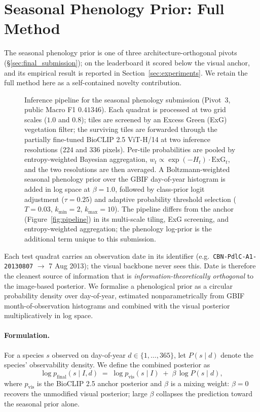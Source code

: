\section{Seasonal Phenology Prior: Full Method}
\label{sec:phenology}

The seasonal phenology prior is one of three architecture-orthogonal pivots
(\S\ref{sec:final_submission}); on the leaderboard it scored below the visual anchor, and its
empirical result is reported in Section~\ref{sec:experiments}. We retain the full method here as
a self-contained novelty contribution.

\begin{figure}[!htbp]
  \centering
  \resizebox{0.82\linewidth}{!}{}
  \caption{Inference pipeline for the seasonal phenology submission (Pivot~3, public Macro F1 $0.41346$). Each quadrat is processed at two grid scales ($1.0$ and $0.8$); tiles are screened by an Excess Green (ExG) vegetation filter; the surviving tiles are forwarded through the partially fine-tuned BioCLIP 2.5 ViT-H/14 at two inference resolutions ($224$ and $336$ pixels). Per-tile probabilities are pooled by entropy-weighted Bayesian aggregation, $w_t \propto \exp(-H_t)\cdot\mathrm{ExG}_t$, and the two resolutions are then averaged. A Boltzmann-weighted seasonal phenology prior over the GBIF day-of-year histogram is added in log space at $\beta{=}1.0$, followed by class-prior logit adjustment ($\tau{=}0.25$) and adaptive probability threshold selection ($T{=}0.03$, $k_{\min}{=}2$, $k_{\max}{=}10$). The pipeline differs from the anchor (Figure~\ref{fig:pipeline}) in its multi-scale tiling, ExG screening, and entropy-weighted aggregation; the phenology log-prior is the additional term unique to this submission.}
  \label{fig:phenology_pipeline}
\end{figure}

Each test quadrat carries an observation date in its identifier (e.g.\ \texttt{CBN-PdlC-A1-20130807} $\to$ 7 Aug 2013); the visual backbone never sees this. Date is therefore the cleanest source of information that is \emph{information-theoretically orthogonal} to the image-based posterior. We formalise a phenological prior as a circular probability density over day-of-year, estimated nonparametrically from GBIF month-of-observation histograms and combined with the visual posterior multiplicatively in log space.

\paragraph{Formulation.} For a species $s$ observed on day-of-year $d \in \{1,\ldots,365\}$, let $P(s \mid d)$ denote the species' observability density. We define the combined posterior as
\begin{equation}
  \log p_{\text{final}}(s \mid I, d) \;=\; \log p_{\text{vis}}(s \mid I) \;+\; \beta \,\log P(s \mid d),
\end{equation}
where $p_{\text{vis}}$ is the BioCLIP 2.5 anchor posterior and $\beta$ is a mixing weight: $\beta{=}0$ recovers the unmodified visual posterior; large $\beta$ collapses the prediction toward the seasonal prior alone.

